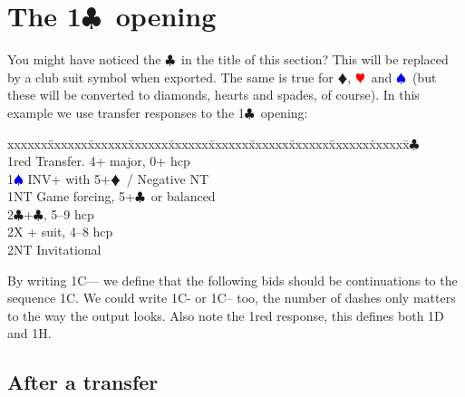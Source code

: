\documentclass[a4paper]{article}
\newcommand{\BC}{\textcolor{OliveGreen}{$\clubsuit$}}
\newcommand{\BD}{\textcolor{RedOrange}{$\vardiamondsuit$}}
\newcommand{\BH}{\textcolor{Red}{$\varheartsuit${}}}
\newcommand{\BS}{\textcolor{Blue}{$\spadesuit${}}}
\newcommand{\pdfc}{\texorpdfstring{\BC{}}{C}}
\newenvironment{bidtable}
{\begin{tabbing}

xxxxxx\=xxxxxx\=xxxxxx\=xxxxxx\=xxxxxx\=xxxxxx\=xxxxxx\=xxxxxx\=xxxxxx\=xxxxxx\=\kill}
{\end{tabbing} }%
\begin{document}
\section{The 1\pdfc\ opening}

You might have noticed the \BC\ in the title of this section? This
will be replaced by a club suit symbol when exported. The same is
true for \BD , \BH\ and \BS\ (but these will be converted to diamonds,
hearts and spades, of course).
\bigbreak
In this example we use transfer responses to the 1\BC\ opening:
\bigbreak
\begin{bidtable}
1\BC\+\\
1red \> Transfer. 4+ major, 0+ hcp\\
1\BS \> INV+ with 5+\BD\ / Negative NT\\
1NT \> Game forcing, 5+\BC\ or balanced\\
2\BC {}+\BC , 5--9 hcp\\
2X + suit, 4--8 hcp\\
2NT \> Invitational\-
\end{bidtable}
\bigbreak
By writing 1C--- we define that the following bids should be
continuations to the sequence 1C. We could write 1C- or 1C-- too,
the number of dashes only matters to the way the output looks. Also
note the 1red response, this defines both 1D and 1H.
\bigbreak
\subsection{After a transfer}
\end{document}
